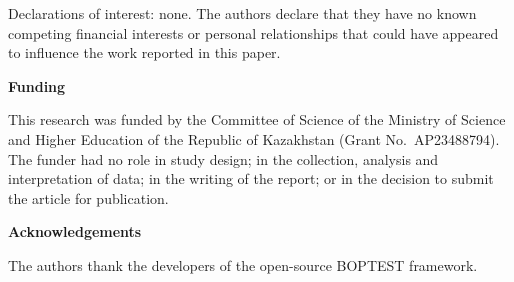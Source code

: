 \documentclass[12pt,a4paper]{article}
\begin{document}
Declarations of interest: none. The authors declare that they have no known competing financial
interests or personal relationships that could have appeared to influence the work reported in
this paper.

\textbf{Funding}

This research was funded by the Committee of Science of the Ministry of Science and Higher
Education of the Republic of Kazakhstan (Grant No.~AP23488794). The funder had no role in study
design; in the collection, analysis and interpretation of data; in the writing of the report; or
in the decision to submit the article for publication.

\textbf{Acknowledgements}

The authors thank the developers of the open-source BOPTEST framework.
\end{document}
